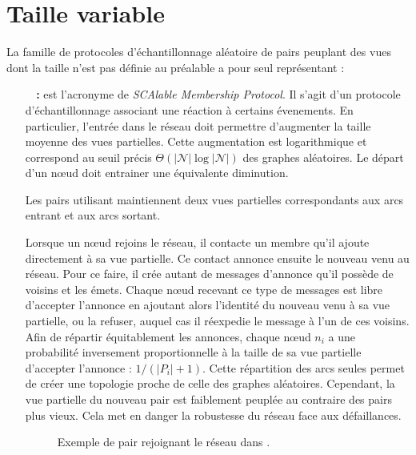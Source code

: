 

\section{Taille variable}
\label{net:sec:variable}

La famille de protocoles d'échantillonnage aléatoire de pairs peuplant des vues
dont la taille n'est pas définie au préalable a pour seul représentant :

\begin{itemize}
\item [\textbf{\SCAMP~\cite{ganesh2001scamp, ganesh2003peer} :}] est l'acronyme
  de \emph{SCAlable Membership Protocol}. Il s'agit d'un protocole
  d'échantillonnage associant une réaction à certains évenements. En
  particulier, l'entrée dans le réseau doit permettre d'augmenter la taille
  moyenne des vues partielles. Cette augmentation est logarithmique et
  correspond au seuil précis $\Theta (|\mathcal{N}|\log |\mathcal{N}|)$ des
  graphes aléatoires. Le départ d'un nœud doit entrainer une équivalente
  diminution.

  Les pairs utilisant \SCAMP maintiennent deux vues partielles correspondants
  aux arcs entrant et aux arcs sortant.

  Lorsque un nœud rejoins le réseau, il contacte un membre qu'il ajoute
  directement à sa vue partielle. Ce contact annonce ensuite le nouveau venu au
  réseau. Pour ce faire, il crée autant de messages d'annonce qu'il possède de
  voisins et les émets. Chaque nœud recevant ce type de messages est libre
  d'accepter l'annonce en ajoutant alors l'identité du nouveau venu à sa vue
  partielle, ou la refuser, auquel cas il réexpedie le message à l'un de ces
  voisins. Afin de répartir équitablement les annonces, chaque nœud $n_i$ a une
  probabilité inversement proportionnelle à la taille de sa vue partielle
  d'accepter l'annonce : $1/(|P_i|+1)$. Cette répartition des arcs seules permet
  de créer une topologie proche de celle des graphes aléatoires. Cependant, la
  vue partielle du nouveau pair est faiblement peuplée au contraire des pairs
  plus vieux. Cela met en danger la robustesse du réseau face aux défaillances.

  \begin{figure}
    \centering
    
    \caption{\label{net:fig:scampexample} Exemple de pair rejoignant le réseau
      dans \SCAMP.}
  \end{figure}


\end{itemize}
